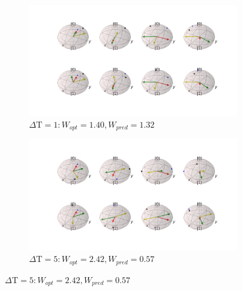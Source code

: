 \begin{figure}
	\centering
	\begin{subfigure}{0.85\textwidth}
		\centering
		\includegraphics[width=\textwidth]{img/bloch_comp_1}
		\caption{$\Delta \mathrm{T} = 1: W_{opt} = 1.40, W_{pred} = 1.32$}
		\label{}
	\end{subfigure}
	\begin{subfigure}{0.85\textwidth}
		\centering
		\includegraphics[width=\textwidth]{img/bloch_comp_5}
		\caption{$\Delta \mathrm{T} = 5: W_{opt} = 2.42, W_{pred} = 0.57$}
		\label{}
	\end{subfigure}
\end{figure}